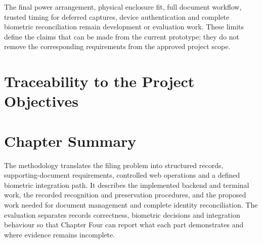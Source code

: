 The final power arrangement, physical enclosure fit, full document workflow, trusted timing for deferred captures, device authentication and complete biometric reconciliation remain development or evaluation work. These limits define the claims that can be made from the current prototype; they do not remove the corresponding requirements from the approved project scope.

\section{Traceability to the Project Objectives}\label{sec:3-15}




\section{Chapter Summary}\label{sec:3-16}

The methodology translates the filing problem into structured records, supporting-document requirements, controlled web operations and a defined biometric integration path. It describes the implemented backend and terminal work, the recorded recognition and preservation procedures, and the proposed work needed for document management and complete identity reconciliation. The evaluation separates records correctness, biometric decisions and integration behaviour so that Chapter Four can report what each part demonstrates and where evidence remains incomplete.

